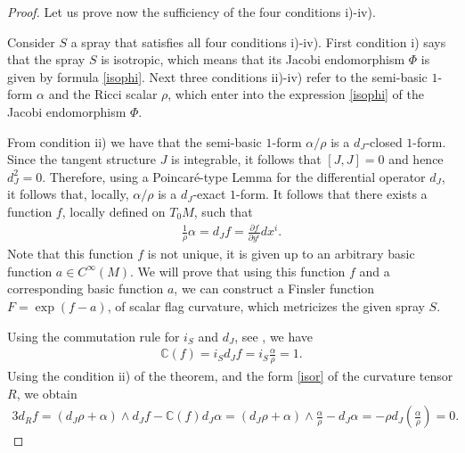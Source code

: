 \documentclass[oneside,english]{amsart}
\numberwithin{equation}{section}
\numberwithin{figure}{section}
\theoremstyle{plain}
\theoremstyle{plain}
\theoremstyle{definition}
\theoremstyle{plain}
\theoremstyle{plain}
\theoremstyle{plain}
\theoremstyle{remark}
\theoremstyle{remark}
\begin{document}
\begin{proof}
  Let us prove now the sufficiency of the four conditions i)-iv).

  Consider $S$ a spray that satisfies all four conditions i)-iv). First
  condition i) says that the spray $S$ is isotropic, which means that
  its Jacobi endomorphism $\Phi$ is given by formula
  \eqref{isophi}. Next three conditions ii)-iv) refer to the semi-basic
  $1$-form $\alpha$ and the Ricci scalar $\rho$, which enter into the expression \eqref{isophi} of
  the Jacobi endomorphism $\Phi$.

  From condition ii) we have that the semi-basic $1$-form
  $\alpha/\rho$ is a $d_J$-closed $1$-form. Since the tangent
  structure $J$ is integrable, it follows that $[J,J]=0$ and hence
  $d_J^2=0$. Therefore, using a Poincar\'e-type Lemma for the
  differential operator $d_J$, it follows that, locally, $\alpha/\rho$ is a $d_J$-exact $1$-form. It follows that
  there exists a function $f$, locally defined on $T_0M$, such that 
  \begin{eqnarray}
    \frac{1}{\rho}\alpha = d_Jf=\frac{\partial f}{\partial y^i} dx^i. \label{radjf} \end{eqnarray}
  Note that this function $f$ is not unique, it is given up to an
  arbitrary basic function $a\in C^{\infty}(M)$. We will prove that using this
  function $f$ and a corresponding basic function $a$, we can construct a
  Finsler function $F=\exp(f-a)$, of scalar flag curvature, which
  metricizes the given spray $S$. 

  Using the commutation rule for $i_S$ and $d_J$, see \cite[Appendix
  A]{GM00}, we have 
  \begin{eqnarray}
    {\mathbb C}(f)= i_Sd_Jf = i_S\frac{\alpha}{\rho}=1. \label{eq3}
  \end{eqnarray}
  Using the condition ii) of the theorem, and the form \eqref{isor} of the curvature tensor $R$, we obtain
  \begin{eqnarray}
    3d_Rf= (d_J\rho+\alpha )\wedge d_Jf -
    \mathbb{C}(f)  d_J\alpha 
    = (d_J\rho +\alpha )\wedge \frac{\alpha}{\rho} - d_J\alpha =
    - \rho
    d_J\left(\frac{\alpha}{\rho}\right)=0. \label{eq5} \end{eqnarray}


\end{proof}
\end{document}

